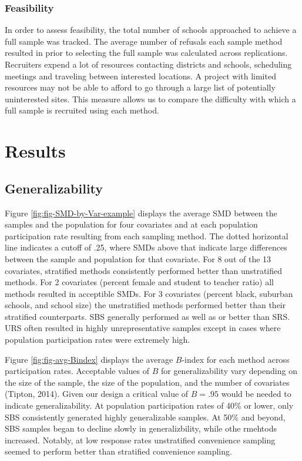 \documentclass[man,floatsintext]{apa6}
\begin{document}
\hypertarget{feasibility}{%
\subsubsection{Feasibility}\label{feasibility}}

In order to assess feasibility, the total number of schools approached to achieve a full sample was tracked. The average number of refusals each sample method resulted in prior to selecting the full sample was calculated across replications. Recruiters expend a lot of resources contacting districts and schools, scheduling meetings and traveling between interested locations. A project with limited resources may not be able to afford to go through a large list of potentially uninterested sites. This measure allows us to compare the difficulty with which a full sample is recruited using each method.

\hypertarget{results}{%
\section{Results}\label{results}}

\hypertarget{generalizability-1}{%
\subsection{Generalizability}\label{generalizability-1}}

Figure \ref{fig:fig-SMD-by-Var-example} displays the average SMD between the samples and the population for four covariates and at each population participation rate resulting from each sampling method. The dotted horizontal line indicates a cutoff of .25, where SMDs above that indicate large differences between the sample and population for that covariate. For 8 out of the 13 covariates, stratified methods consistently performed better than unstratified methods. For 2 covariates (percent female and student to teacher ratio) all methods resulted in acceptible SMDs. For 3 covariates (percent black, suburban schools, and school size) the unstratified methods performed better than their stratified counterparts. SBS generally performed as well as or better than SRS. URS often resulted in highly unrepresentative samples except in cases where population participation rates were extremely high.

Figure \ref{fig:fig-avg-Bindex} displays the average \(B\)-index for each method across participation rates. Acceptable values of \(B\) for generalizability vary depending on the size of the sample, the size of the population, and the number of covariates (Tipton, 2014). Given our design a critical value of \(B = .95\) would be needed to indicate generalizability. At population participation rates of 40\% or lower, only SBS consistently generated highly generalizable samples. At 50\% and beyond, SBS samples began to decline slowly in generalizbility, while othe rmehtods increased. Notably, at low response rates unstratified convenience sampling seemed to perform better than stratified convenience sampling.
\end{document}
